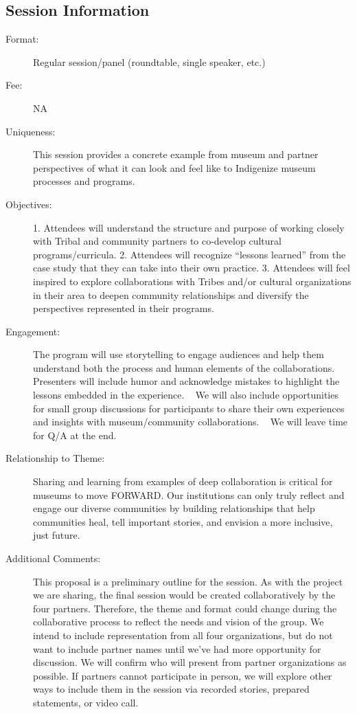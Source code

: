 \documentclass{report}
\begin{document}
              \subsection*{Session Information}
                \begin{description}
                  \item [Format:] Regular session/panel (roundtable, single speaker, etc.)
							    
								  \item [Fee:]NA
							     
							    \item [Uniqueness:]This session provides a concrete example from museum and partner perspectives of what it can look and feel like to Indigenize museum processes and programs.
							    \item [Objectives:]1. Attendees will understand the structure and purpose of working closely with Tribal and community partners to co-develop cultural programs/curricula.
2. Attendees will recognize “lessons learned” from the case study that they can take into their own practice.
3. Attendees will feel inspired to explore collaborations with Tribes and/or cultural organizations in their area to deepen community relationships and diversify the perspectives represented in their programs.
							    \item [Engagement:]The program will use storytelling to engage audiences and help them understand both the process and human elements of the collaborations. Presenters will include humor and acknowledge mistakes to highlight the lessons embedded in the experience.
 
We will also include opportunities for small group discussions for participants to share their own experiences and insights with museum/community collaborations.
 
We will leave time for Q/A at the end.
							    \item [Relationship to Theme:]Sharing and learning from examples of deep collaboration is critical for museums to move FORWARD. Our institutions can only truly reflect and engage our diverse communities by building relationships that help communities heal, tell important stories, and envision a more inclusive, just future.
							    
                    \item [Additional Comments: ]This proposal is a preliminary outline for the session. As with the project we are sharing, the final session would be created collaboratively by the four partners. Therefore, the theme and format could change during the collaborative process to reflect the needs and vision of the group. We intend to include representation from all four organizations, but do not want to include partner names until we've had more opportunity for discussion. We will confirm who will present from partner organizations as possible. If partners cannot participate in person, we will explore other ways to include them in the session via recorded stories, prepared statements, or video call.
  

                \end{description}
\end{document}
